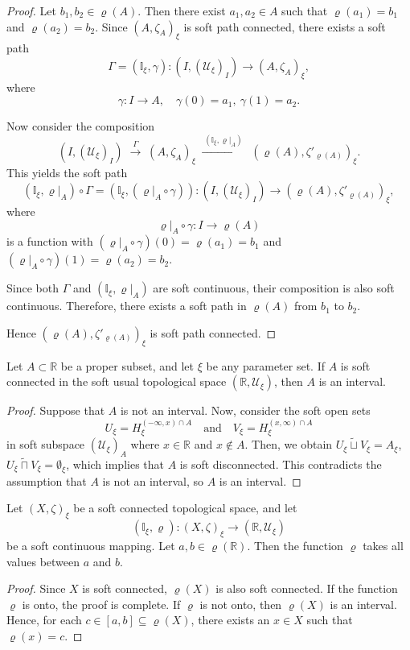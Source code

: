 \documentclass[preprint,12pt]{elsarticle}
\begin{document}
\begin{proof}
Let $b_1, b_2 \in \varrho(A)$. Then there exist $a_1, a_2 \in A$ such that $\varrho(a_1)=b_1$ and $\varrho(a_2)=b_2$.
Since $(A,\zeta_A)_\xi$ is soft path connected, there exists a soft path
\[
\Gamma =(\mathbb{I}_\xi ,\gamma) \colon (I,(\mathscr{U}_{\xi})_{I})\to  (A,\zeta_A)_\xi,
\]
where
\[
\gamma: I \to A, \quad \gamma(0)=a_1, \ \gamma(1)=a_2.
\]

Now consider the composition
\[
(I,(\mathscr{U}_{\xi})_{I}) \;\xrightarrow{\;\Gamma\;}\; (A,\zeta_A)_\xi \;\xrightarrow{\;(\mathbb{I}_\xi, \varrho|_A)\;}\;(\varrho(A),\zeta'_{\varrho(A)})_{\xi}.
\]
This yields the soft path
\[
(\mathbb{I}_\xi, \varrho|_A)\circ\Gamma = (\mathbb{I}_\xi , (\varrho|_A \circ \gamma) ) \colon (I,(\mathscr{U}_{\xi})_{I}) \to (\varrho(A),\zeta'_{\varrho(A)})_{\xi},
\]
where \[\varrho|_A\circ \gamma: I \to \varrho(A)\] is a function with $(\varrho|_A\circ\gamma)(0)=\varrho(a_1)=b_1$ and $(\varrho|_A\circ\gamma)(1)=\varrho(a_2)=b_2$.

Since both $\Gamma$ and $(\mathbb{I}_\xi, \varrho|_A)$ are soft continuous, their composition is also soft continuous.
Therefore, there exists a soft path in $\varrho(A)$ from $b_1$ to $b_2$.

Hence $(\varrho(A),\zeta'_{\varrho(A)})_{\xi}$ is soft path connected.
\end{proof}
\begin{prop}
 Let $A\subset \mathbb{R}$ be a proper subset, and let $\xi$ be any parameter set. If $A$ is soft connected in the soft usual topological space $(\mathbb{R},\mathscr{U}_\xi)$, then $A$ is an interval.
\end{prop}

\begin{proof}
 Suppose that $A$ is not an interval. Now, consider the soft open sets $$U_\xi=H^{(-\infty,x)\cap A}_\xi \quad  \text{and} \quad V_\xi=H^{(x,\infty)\cap A}_\xi$$ in soft subspace $ (\mathscr{U}_{\xi})_{A}$ where $x\in \mathbb{R}$ and $x\notin A$.
Then, we obtain \(U_\xi\widetilde{\sqcup} V_\xi=A_\xi\), \(U_\xi\widetilde{\sqcap} V_\xi=\emptyset_\xi\),  which implies that $A$ is soft disconnected. This contradicts the assumption that \(A\) is not an interval, so \(A\) is an interval.
\end{proof}

\begin{thm}
Let $(X,\zeta)_\xi$ be a soft connected topological space, and let $$(\mathbb{I}_\xi,\varrho)\colon (X,\zeta)_\xi\to (\mathbb{R}, \mathscr{U}_\xi) $$ be a soft continuous mapping. Let $a, b \in \varrho(\mathbb{R})$. Then the function $\varrho$ takes all values between $a$ and $b$.
\end{thm}
 \begin{proof}
Since $X$ is soft connected, $\varrho(X)$ is also soft connected. If the function $\varrho$ is onto, the proof is complete. If $\varrho$ is not onto, then $\varrho(X)$ is an interval. Hence, for each $c\in [a , b]\subseteq \varrho(X)$, there exists an $x\in X$ such that $\varrho(x) = c$.

 \end{proof}
\end{document}
